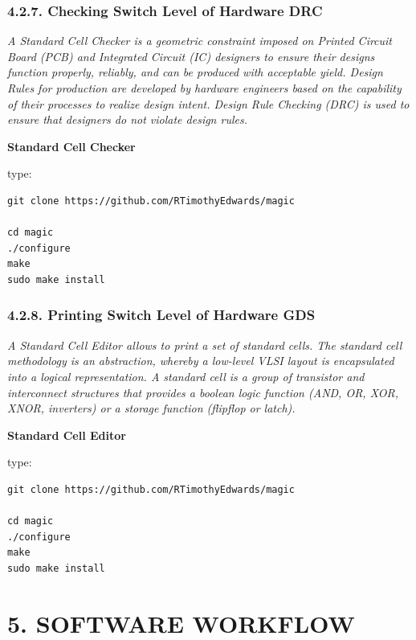 \documentclass[
]{article}
\begin{document}
\hypertarget{checking-switch-level-of-hardware-drc-1}{%
\subsubsection{4.2.7. Checking Switch Level of Hardware
DRC}\label{checking-switch-level-of-hardware-drc-1}}

\emph{A Standard Cell Checker is a geometric constraint imposed on
Printed Circuit Board (PCB) and Integrated Circuit (IC) designers to
ensure their designs function properly, reliably, and can be produced
with acceptable yield. Design Rules for production are developed by
hardware engineers based on the capability of their processes to realize
design intent. Design Rule Checking (DRC) is used to ensure that
designers do not violate design rules.}

\textbf{Standard Cell Checker}

type:

\begin{verbatim}
git clone https://github.com/RTimothyEdwards/magic

cd magic
./configure
make
sudo make install
\end{verbatim}

\hypertarget{printing-switch-level-of-hardware-gds-1}{%
\subsubsection{4.2.8. Printing Switch Level of Hardware
GDS}\label{printing-switch-level-of-hardware-gds-1}}

\emph{A Standard Cell Editor allows to print a set of standard cells.
The standard cell methodology is an abstraction, whereby a low-level
VLSI layout is encapsulated into a logical representation. A standard
cell is a group of transistor and interconnect structures that provides
a boolean logic function (AND, OR, XOR, XNOR, inverters) or a storage
function (flipflop or latch).}

\textbf{Standard Cell Editor}

type:

\begin{verbatim}
git clone https://github.com/RTimothyEdwards/magic

cd magic
./configure
make
sudo make install
\end{verbatim}

\hypertarget{software-workflow-1}{%
\section{5. SOFTWARE WORKFLOW}\label{software-workflow-1}}
\end{document}
